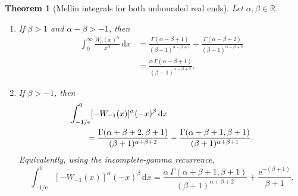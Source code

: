 \documentclass[11pt]{article}
\newtheorem{theorem}{Theorem}[section]
\theoremstyle{remark}
\newcommand{\Wz}{W_0}
\newcommand{\Wm}{W_{-1}}
\newcommand{\ee}{\mathrm e}
\newcommand{\dd}{\,\mathrm d}
\begin{document}
\begin{theorem}[Mellin integrals for both unbounded real ends]
\label{thm:mellin-integrals}
Let \(\alpha,\beta\in\mathbb R\).
\begin{enumerate}[label=\textup{(\roman*)}]
\item If \(\beta>1\) and \(\alpha-\beta>-1\), then
\begin{align}
 \int_0^\infty \frac{\Wz(x)^\alpha}{x^\beta}\dd x
 &=\frac{\Gamma(\alpha-\beta+1)}
       {(\beta-1)^{\alpha-\beta+1}}
  +\frac{\Gamma(\alpha-\beta+2)}
       {(\beta-1)^{\alpha-\beta+2}}
 \label{eq:mellin-W0}\\
 &=\frac{\alpha\,\Gamma(\alpha-\beta+1)}
 { (\beta-1)^{\alpha-\beta+2}}.
 \label{eq:mellin-W0-simple}
\end{align}
\item If \(\beta>-1\), then
\begin{align}
 &\int_{-1/\ee}^{0}
   [-\Wm(x)]^\alpha(-x)^\beta\dd x\notag\\
 &\qquad=
 \frac{\Gamma(\alpha+\beta+2,\beta+1)}
      {(\beta+1)^{\alpha+\beta+2}}
 -\frac{\Gamma(\alpha+\beta+1,\beta+1)}
      {(\beta+1)^{\alpha+\beta+1}}.
 \label{eq:mellin-Wm}
\end{align}
Equivalently, using the incomplete-gamma recurrence,
\begin{equation}\label{eq:mellin-Wm-simple}
 \int_{-1/\ee}^{0}
   [-\Wm(x)]^\alpha(-x)^\beta\dd x
 =\frac{\alpha\,\Gamma(\alpha+\beta+1,\beta+1)}
       {(\beta+1)^{\alpha+\beta+2}}
  +\frac{\ee^{-(\beta+1)}}{\beta+1}.
\end{equation}
\end{enumerate}
\end{theorem}
\end{document}
